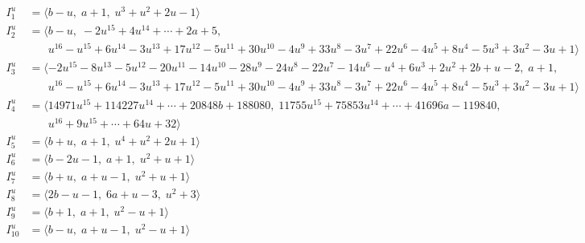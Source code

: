 \documentclass[1p]{elsarticle_modified}
\theoremstyle{definition}
\begin{document}
\begin{align*}
I^u_{1}&=\langle 
b- u,\;a+1,\;u^3+u^2+2 u-1\rangle \\
I^u_{2}&=\langle 
b- u,\;-2 u^{15}+4 u^{14}+\cdots+2 a+5,\\
\phantom{I^u_{2}}&\phantom{= \langle  }u^{16}- u^{15}+6 u^{14}-3 u^{13}+17 u^{12}-5 u^{11}+30 u^{10}-4 u^9+33 u^8-3 u^7+22 u^6-4 u^5+8 u^4-5 u^3+3 u^2-3 u+1\rangle \\
I^u_{3}&=\langle 
-2 u^{15}-8 u^{13}-5 u^{12}-20 u^{11}-14 u^{10}-28 u^9-24 u^8-22 u^7-14 u^6- u^4+6 u^3+2 u^2+2 b+u-2,\;a+1,\\
\phantom{I^u_{3}}&\phantom{= \langle  }u^{16}- u^{15}+6 u^{14}-3 u^{13}+17 u^{12}-5 u^{11}+30 u^{10}-4 u^9+33 u^8-3 u^7+22 u^6-4 u^5+8 u^4-5 u^3+3 u^2-3 u+1\rangle \\
I^u_{4}&=\langle 
14971 u^{15}+114227 u^{14}+\cdots+20848 b+188080,\;11755 u^{15}+75853 u^{14}+\cdots+41696 a-119840,\\
\phantom{I^u_{4}}&\phantom{= \langle  }u^{16}+9 u^{15}+\cdots+64 u+32\rangle \\
I^u_{5}&=\langle 
b+u,\;a+1,\;u^4+u^2+2 u+1\rangle \\
I^u_{6}&=\langle 
b-2 u-1,\;a+1,\;u^2+u+1\rangle \\
I^u_{7}&=\langle 
b+u,\;a+u-1,\;u^2+u+1\rangle \\
I^u_{8}&=\langle 
2 b- u-1,\;6 a+u-3,\;u^2+3\rangle \\
I^u_{9}&=\langle 
b+1,\;a+1,\;u^2- u+1\rangle \\
I^u_{10}&=\langle 
b- u,\;a+u-1,\;u^2- u+1\rangle \\
\end{align*}\\
\end{document}
